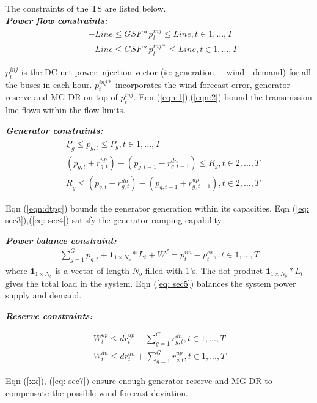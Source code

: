 The constraints of the TS are listed below. \\
\textbf{\emph{Power flow constraints:} }
\begin{align}
&-Line\leq GSF*p^{inj}_{t}\leq Line, t\in{1,...,T}\label{eqn:1}\\
&-Line\leq GSF*p^{inj*}_{t}\leq Line, t\in{1,...,T}\label{eqn:2}
\end{align}

$p^{inj}_{t}$ is the DC net power injection vector (ie: generation + wind - demand) for all the buses in each hour. $p^{inj*}_{t}$ incorporates the wind forecast error, generator reserve and MG DR on top of $p^{inj}_{t}$. Eqn (\ref{eqn:1}),(\ref{eqn:2})  bound the transmission line flows within the flow limits. 
 
\textbf{\emph{Generator constraints:} }
\begin{align}
& \underline{P}_g\leq p_{g,t}\leq  \overline{P}_g,  t\in{1,...,T}\label{eqn:dtpg}\\
& (p_{g,t} +r_{g,t}^{up})  - (p_{g,t-1}-  r_{g,t-1}^{dn}) \leq \overline{R}_g ,  t\in{2,...,T}\label{eq: sec3} \\
&  \underline{R}_{g} \leq (p_{g,t} -  r_{g,t}^{dn})  - (p_{g,t-1}+ r_{g,t-1}^{up}) , t\in{2,...,T}\label{eq: sec4} 
\end{align}

Eqn (\ref{eqn:dtpg}) bounds the generator generation within its capacities. Eqn (\ref{eq: sec3}),(\ref{eq: sec4}) satisfy the generator ramping capability. 

\textbf{\emph{Power balance constraint:} }
\begin{align}
\sum_{g=1}^{G} p_{g,t} + \mathbf{1}_{1\times N_b}*L_{t} + W^f = p^{im}_t-p^{ex}_t, ,  t\in{1,...,T}\label{eq: sec5} 
\end{align}
where $\mathbf{1}_{1\times N_b}$ is a vector of length $N_b$ filled with 1's. The dot product $\mathbf{1}_{1\times N_b}*L_{t}$ gives the total load in the system. Eqn (\ref{eq: sec5}) balances the system power supply and demand. 

\textbf{\emph{Reserve constraints:} }

\begin{align}
W^{up}_t \leq dr^{up}_t + \sum_{g=1}^{G} r_{g,t}^{dn}, t\in{1,...,T} \label{xx} \\
W^{dn}_t \leq dr^{dn}_t + \sum_{g=1}^{G} r_{g,t}^{up}, t\in{1,...,T} \label{eq: sec7} 
\end{align}

Eqn (\ref{xx}), (\ref{eq: sec7}) ensure enough generator reserve and MG DR to compensate the possible wind forecast deviation. 

